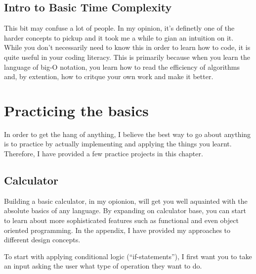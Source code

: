 \documentclass[12pt,a4paper]{book}
\begin{document}
		\section{Intro to Basic Time Complexity}
			This bit may confuse a lot of people. In my opinion, it's definetly one of the harder concepts to pickup and it took me a while to gian an intuition on it. While you don't necessarily need to know this in order to learn how to code, it is quite useful in your coding literacy. This is primarily because when you learn the language of big-O notation, you learn how to read the efficiency of algorithms and, by extention, how to critque your own work and make it better.
			
		
	\chapter{Practicing the basics}	\label{chap:basics-practice}
		In order to get the hang of anything, I believe the best way to go about anything is to practice by actually implementing and applying the things you learnt. Therefore, I have provided a few practice projects in this chapter.
		\section{Calculator}
			Building a basic calculator, in my opionion, will get you well aquainted with the absolute basics of any language. By expanding on calculator base, you can start to learn about more sophisticated features such as functional and even object oriented programming. In the appendix, I have provided my approaches to different design concepts.
			
			To start with applying conditional logic (``if-statements''), I first want you to take an input 
			asking the user what type of operation they want to do.
			
\end{document}
